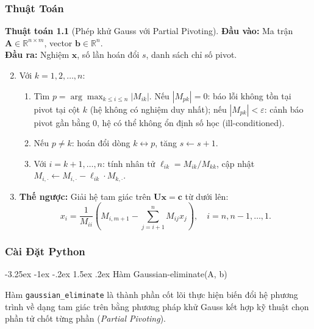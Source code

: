 \documentclass[12pt]{article}
\makeatletter
\newcommand\subsubsubsection{\@startsection{paragraph}{4}{\z@}%
    {-3.25ex \@plus -1ex \@minus -.2ex}%
    {1.5ex \@plus .2ex}%
    {\normalfont\normalsize\bfseries}}
\makeatother
\begin{document}
\subsubsection{Thuật Toán}

\textbf{Thuật toán 1.1} (Phép khử Gauss với Partial Pivoting). \textbf{Đầu vào:} Ma trận $\mathbf{A} \in \mathbb{R}^{n \times m}$, vector $\mathbf{b} \in \mathbb{R}^n$. \\
\textbf{Đầu ra:} Nghiệm $\mathbf{x}$, số lần hoán đổi $s$, danh sách chỉ số pivot.

\begin{enumerate}
    \setcounter{enumi}{1} %
    \item Với $k = 1, 2, \dots, n$:
    \begin{enumerate}[label=\alph*.]
        \item Tìm $p = \arg \max_{k \le i \le n} |M_{ik}|$. Nếu $|M_{pk}| = 0$: báo lỗi không tồn tại pivot tại cột $k$ (hệ không có nghiệm duy nhất); nếu $|M_{pk}| < \varepsilon$: cảnh báo pivot gần bằng 0, hệ có thể không ổn định số học (ill-conditioned).
        \item Nếu $p \neq k$: hoán đổi dòng $k \leftrightarrow p$, tăng $s \leftarrow s + 1$.
        \item Với $i = k + 1, \dots, n$: tính nhân tử $\ell_{ik} = M_{ik}/M_{kk}$, cập nhật $M_{i, \cdot} \leftarrow M_{i, \cdot} - \ell_{ik} \cdot M_{k, \cdot}$.
    \end{enumerate}

    \item \textbf{Thế ngược:} Giải hệ tam giác trên $\mathbf{Ux} = \mathbf{c}$ từ dưới lên:
    \begin{equation}
    x_i = \frac{1}{M_{ii}} \left( M_{i,m+1} - \sum_{j=i+1}^n M_{ij} x_j \right), \quad i = n, n-1, \dots, 1.
    \end{equation}
\end{enumerate}

\subsubsection{Cài Đặt Python}
\subsubsubsection{Hàm Gaussian-eliminate(A, b)}

Hàm \texttt{gaussian\_eliminate} là thành phần cốt lõi thực hiện biến đổi hệ phương trình về dạng tam giác trên bằng phương pháp khử Gauss kết hợp kỹ thuật chọn phần tử chốt từng phần (\textit{Partial Pivoting}).
\end{document}
